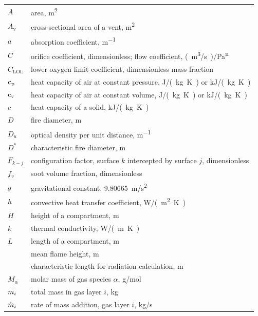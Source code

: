 \documentclass[12pt,twoside]{book}
\begin{document}
\begin{center}
\begin{longtable}{p{1in}  p{5.5 in}}

$A$                 & area, \unit{m^2} \\
$A_{\mathrm{v}}$         & cross-sectional area of a vent, \unit{m^2} \\
$a$                 & absorption coefficient, \unit{m^{-1}} \\
$C$                 & orifice coefficient, dimensionless; flow coefficient, \unit{(m^3/s)/Pa^n} \\
$C_{\mathrm{LOL}}$       & lower oxygen limit coefficient, dimensionless mass fraction \\
${\mathrm{c}}\sb{\mathrm{p}}$               & heat capacity of air at constant pressure, \unit{J/(kg.K)} or \unit{kJ/(kg.K)} \\
${\mathrm{c}}\sb{\mathrm{v}}$               & heat capacity of air at constant volume, \unit{J/(kg.K)} or \unit{kJ/(kg.K)} \\
$c$                 & heat capacity of a solid, k\unit{J/(kg.K)} \\
$D$                 & fire diameter, m \\
$D_u$               & optical density per unit distance, \unit{m^{-1}} \\
$D^*$               & characteristic fire diameter, m \\
$F_{k-j}$           & configuration factor, surface $k$ intercepted by surface $j$, dimensionless \\
$f_v$               & soot volume fraction, dimensionless \\
$g$                 & gravitational constant, 9.80665~\unit{m/s^2} \\
$h$                 & convective heat transfer coefficient, \unit{W/(m^2.K)} \\
$H$                 & height of a compartment, m \\
$k$                 & thermal conductivity, \unit{W/(m.K)} \\
$L$                 & length of a compartment, m \\
                    & mean flame height, m \\
                    & characteristic length for radiation calculation, m \\
$M_\alpha$          & molar mass of gas species $\alpha$, g/mol \\
$m\sb{i}$               & total mass in gas layer $i$, kg \\
$\dot{m}\sb{i}$              & rate of mass addition, gas layer $i$, kg/s \\

\end{longtable}
\end{center}
\end{document}
